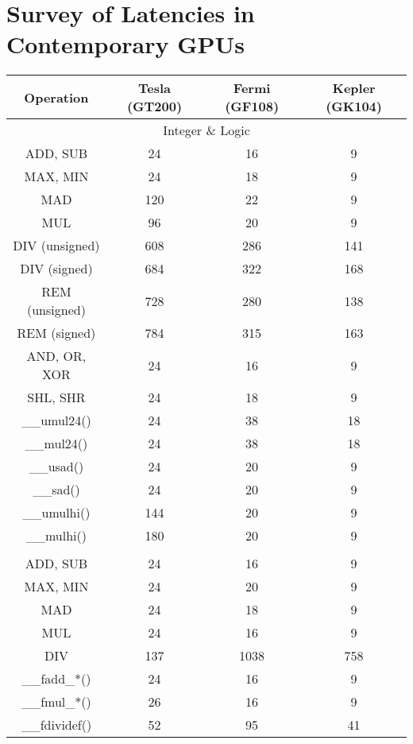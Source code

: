 \chapter{Survey of Latencies in Contemporary GPUs}

\begin{table}
\centering
	\begin{tabular}{c|ccc}
	\hline
	\rowcolor{gray} Operation & Tesla (GT200) & Fermi (GF108) & Kepler (GK104) \\ \hline \hline
	\multicolumn{4}{c}{\cellcolor{lightgray}Integer \& Logic} \\ \hline
	ADD, SUB & 24 & 16 & 9 \\ \hline
	MAX, MIN & 24 & 18 & 9 \\ \hline %
	MAD & 120 & 22 & 9 \\ \hline
	MUL & 96 & 20 & 9 \\ \hline
	DIV (unsigned) & 608 & 286 & 141 \\ \hline
	DIV (signed) & 684 & 322 & 168 \\ \hline
	REM (unsigned) & 728 & 280 & 138 \\ \hline %
	REM (signed) & 784 & 315 & 163 \\ \hline %
	AND, OR, XOR & 24 & 16 & 9 \\ \hline
	SHL, SHR & 24 & 18 & 9 \\ \hline
	\_\_umul24() & 24 & 38 & 18 \\ \hline
	\_\_mul24() & 24 & 38 & 18 \\ \hline %
	\_\_usad() & 24 & 20 & 9 \\ \hline
	\_\_sad() & 24 & 20 & 9 \\ \hline
	\_\_umulhi() & 144 & 20 & 9 \\ \hline
	\_\_mulhi() & 180 & 20 & 9 \\ \hline
	\rowcolor{lightgray} \multicolumn{4}{c}{\cellcolor{lightgray}32-bit Floating Point} \\ \hline
	ADD, SUB & 24 & 16 & 9 \\ \hline
	MAX, MIN & 24 & 20 & 9 \\ \hline %
	MAD & 24 & 18 & 9 \\ \hline
	MUL & 24 & 16 & 9 \\ \hline
	DIV & 137 & 1038 & 758 \\ \hline
	\_\_fadd\_*() & 24 & 16 & 9 \\ \hline
	\_\_fmul\_*() & 26 & 16 & 9 \\ \hline
	\_\_fdividef() & 52 & 95 & 41 \\ \hline

\end{tabular}
\end{table}
